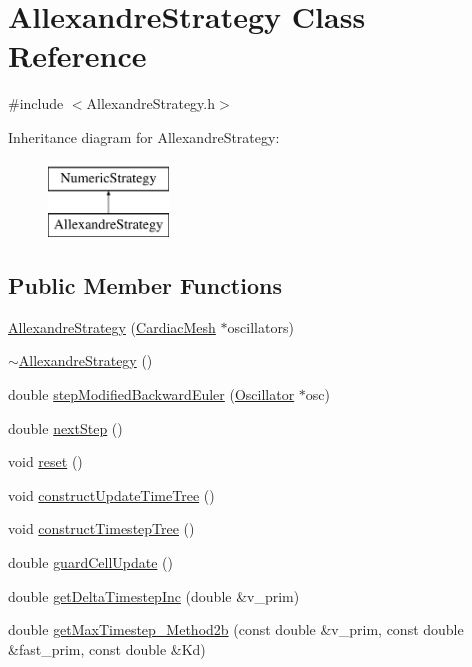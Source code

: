 \hypertarget{class_allexandre_strategy}{\section{Allexandre\+Strategy Class Reference}
\label{class_allexandre_strategy}
}


{\ttfamily \#include $<$Allexandre\+Strategy.\+h$>$}

Inheritance diagram for Allexandre\+Strategy\+:\begin{figure}[H]
\begin{center}
\leavevmode
\includegraphics[height=2.000000cm]{class_allexandre_strategy}
\end{center}
\end{figure}
\subsection*{Public Member Functions}
\begin{DoxyCompactItemize}
\item 
\hyperlink{class_allexandre_strategy_ac14cc10857d943bd555f828fd3c8004d}{Allexandre\+Strategy} (\hyperlink{class_cardiac_mesh}{Cardiac\+Mesh} $\ast$oscillators)
\item 
\hyperlink{class_allexandre_strategy_ac8783c05bbc6e3fea1a99b6ff657fb0d}{$\sim$\+Allexandre\+Strategy} ()
\item 
double \hyperlink{class_allexandre_strategy_a25fe69b84aed988807d10e4b72890d26}{step\+Modified\+Backward\+Euler} (\hyperlink{class_oscillator}{Oscillator} $\ast$osc)
\item 
double \hyperlink{class_allexandre_strategy_a418e280a746b6105eb609cbee6ea99fc}{next\+Step} ()
\item 
void \hyperlink{class_allexandre_strategy_a8f657c6d14d76cef3a312fc862c400f7}{reset} ()
\item 
void \hyperlink{class_allexandre_strategy_a19227368bd05ee1d3df2f655387a2dda}{construct\+Update\+Time\+Tree} ()
\item 
void \hyperlink{class_allexandre_strategy_a194aa637bdd931c1f0541cc11e450c79}{construct\+Timestep\+Tree} ()
\item 
double \hyperlink{class_allexandre_strategy_a9ae2720bb39eeb2044a9192a64e0fa95}{guard\+Cell\+Update} ()
\item 
double \hyperlink{class_allexandre_strategy_aae541b33a9b2183437624ba5ecc083a8}{get\+Delta\+Timestep\+Inc} (double \&v\+\_\+prim)
\item 
double \hyperlink{class_allexandre_strategy_adbcde09e77b6c3091fc972ca135d05d4}{get\+Max\+Timestep\+\_\+\+Method2b} (const double \&v\+\_\+prim, const double \&fast\+\_\+prim, const double \&Kd)
\end{DoxyCompactItemize}
